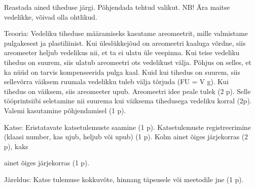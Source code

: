
Reastada ained tiheduse järgi. Põhjendada tehtud valikut. NB! Ära maitse vedelikke, võivad olla ohtlikud.

\hint

\solu
Teooria: Vedeliku tiheduse määramiseks kasutame areomeetrit, mille valmistame pulgakesest ja plastiliinist. Kui üleslükkejõud on areomeetri kaaluga võrdne, siis areomeeter heljub vedelikus nii, et ta ei ulatu üle veepinna. Kui teise vedeliku tihedus on suurem, siis ulatub areomeetri ots vedelikust välja. Pöhjus on selles, et ka nüüd on tarvis kompenseerida pulga kaal. Kuid kui tihedus on suurem, siis sellevõrra väiksem ruumala vedelikku tuleb välja tõrjuda (FU = V g). Kui tihedus on väiksem, siis areomeeter upub. Areomeetri idee peale tulek (2 p). Selle tööprintsiibi seletamine nii suurema kui väiksema tihedusega vedeliku korral (2p). Valemi kasutamine põhjendamisel (1 p).

Katse: Eristatavate katsetulemuste saamine (1 p). Katsetulemuste registreerimine (klaasi number, kas ujub, heljub või upub) (1 p). Kolm ainet õiges järjekorras (2 p), kaks

ainet õiges järjekorras (1 p).

Järeldus: Katse tulemuse kokkuvõte, hinnang täpsusele või meetodile jne (1 p).
\probend
